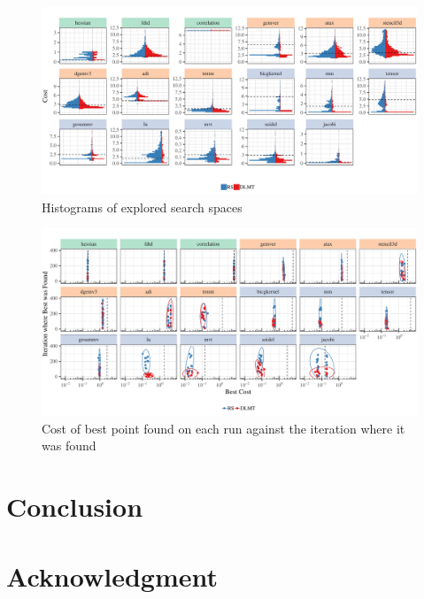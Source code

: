 \documentclass[conference]{IEEEtran}
\begin{document}
\begin{center}
\begin{figure}[p]
\centering
\includegraphics[width=\textwidth]{./img/split_histograms.pdf}
\caption{\label{fig:org6625fc8}
Histograms of explored search spaces}
\end{figure}
\end{center}

\begin{center}
\begin{figure}[p]
\centering
\includegraphics[width=\textwidth]{./img/iteration_best_comparison.pdf}
\caption{\label{fig:org6b6fbcf}
Cost of best point found on each run against the iteration where it was found}
\end{figure}
\end{center}
\section{Conclusion}
\label{sec:org6ee9368}
\section*{Acknowledgment}
\label{sec:org52ad49f}


\end{document}
